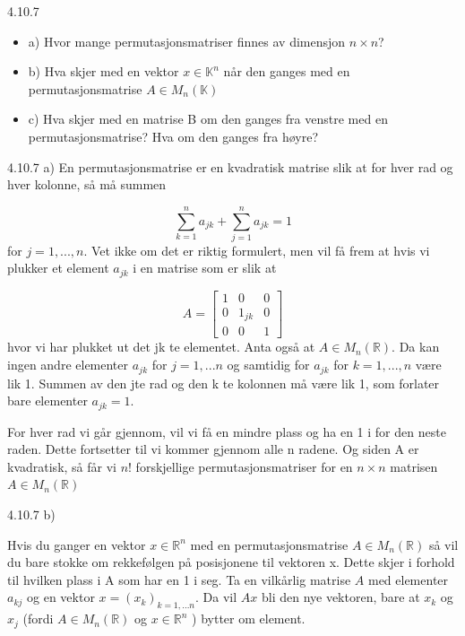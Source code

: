 \documentclass[a4paper,norsk]{article}
\begin{document}
\begin{oppgavebox}{4.10.7}{}
\begin{itemize}
    \item a) Hvor mange permutasjonsmatriser finnes av dimensjon $ n \times n $?
    \item b) Hva skjer med en vektor $ x \in \mathbb{K}^n $  når den ganges med en permutasjonsmatrise $ A \in M_n(\mathbb{K}) $ 
    \item c) Hva skjer med en matrise B om den ganges fra venstre med en permutasjonsmatrise? Hva om den ganges fra høyre?
\end{itemize}

\begin{proofbox}{4.10.7 a)}{}
En permutasjonsmatrise er en kvadratisk matrise slik at for hver rad og hver kolonne, så må summen

\[
    \sum_{ k=1 }^{ n } a_{jk} + \sum_{ j=1 }^{ n } a_{jk} = 1
\]
for $ j=1, ..., n $. Vet ikke om det er riktig formulert, men vil få frem at hvis vi plukker et element $ a_{jk} $ i en matrise som er slik at

\[
    A = \begin{bmatrix}
        1&0&0\\
        0&1_{jk}&0\\
        0&0&1
    \end{bmatrix} 
\]
hvor vi har plukket ut det jk te elementet. Anta også at $ A \in M_n(\mathbb{R}) $. Da kan ingen andre elementer $ a_{jk} $ for $ j=1,...n $ og samtidig for $ a_{jk} $ for $ k=1, ..., n $ være lik 1. Summen av den jte rad og den k te kolonnen må være lik 1, som forlater bare elementer $ a_{jk}=1 $.

For hver rad vi går gjennom, vil vi få en mindre plass og ha en 1 i for den neste raden. Dette fortsetter til vi kommer gjennom alle n radene. Og siden A er kvadratisk, så får vi $ n! $ forskjellige permutasjonsmatriser for en $ n \times  n$  matrisen $ A \in M_n(\mathbb{R}) $  

    
\end{proofbox}


\begin{proofbox}{4.10.7 b)}{}

Hvis du ganger en vektor $ x \in \mathbb{R}^n $ med en permutasjonsmatrise $ A \in M_n(\mathbb{R}) $ så vil du bare stokke om rekkefølgen på posisjonene til vektoren x. Dette skjer i forhold til hvilken plass i A som har en 1 i seg. Ta en vilkårlig matrise $ A $ med elementer $ a_{kj} $ og en vektor $ x = (x_k)_{k=1,...n} $. Da vil $ Ax $ bli den nye vektoren, bare at $ x_k $ og $ x_j $ (fordi $ A\in M_n(\mathbb{R}) $ og $ x \in \mathbb{R}^n $  ) bytter om element.


\end{proofbox}
\end{oppgavebox}
\end{document}
